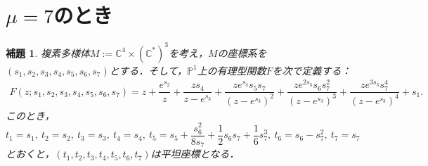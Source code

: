 \documentclass[a4paper,11pt]{jbook}
\theoremstyle{plain}
\newtheorem{lem}[thm]{補題}
\theoremstyle{definition}
\theoremstyle{remark}
\theoremstyle{proof}
\numberwithin{equation}{section}
\def\CC{{\mathbb C}}
\def\PP{{\mathbb P}}
\begin{document}
\section{$\mu=7$のとき}%
\begin{lem}
複素多様体$M:=\CC^4\times(\CC^*)^3$を考え，$M$の座標系を$(s_1,s_2,s_3,s_4,s_5,s_6,s_7)$とする．そして，$\PP^1$上の有理型関数$F$を次で定義する：
\begin{align}F(z;s_1,s_2,s_3,s_4,s_5,s_6,s_7)=z+\dfrac{e^{s_2}}{z}+\dfrac{zs_4}{z-e^{s_3}}+\dfrac{ze^{s_3}s_5s_7}{(z-e^{s_3})^2}+\dfrac{ze^{2s_3}s_6s_7^2}{(z-e^{s_3})^3}+\dfrac{ze^{3s_3}s_7^4}{(z-e^{s_3})^4}+s_1.\end{align}
このとき，$t_1=s_1, \ t_2=s_2, \ t_3=s_3, \ t_4=s_4, \ t_5=s_5+\dfrac{s_6^2}{8s_7}+\dfrac{1}{2}s_6s_7+\dfrac{1}{6}s_7^3, \ t_6=s_6-s_7^2, \ t_7=s_7$とおくと，$(t_1,t_2,t_3,t_4,t_5,t_6,t_7)$は平坦座標となる．
\end{lem}
\end{document}
